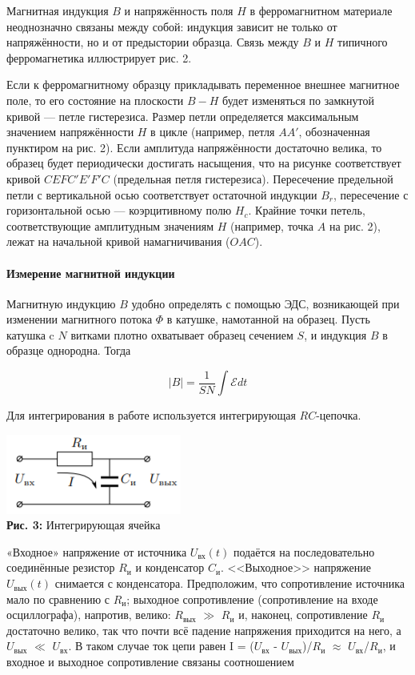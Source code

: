 \documentclass[12pt,a4paper]{scrartcl}
\begin{document}
	Магнитная индукция $ B $ и напряжённость поля $ H $ в ферромагнитном материале неоднозначно связаны между собой: индукция зависит
не только от напряжённости, но и от предыстории образца. Связь между $ B $ и $ H $ типичного ферромагнетика иллюстрирует рис. 2.

Если к ферромагнитному образцу прикладывать переменное внешнее
магнитное поле, то его состояние на плоскости $ B-H $ будет изменяться
по замкнутой кривой — петле гистерезиса. Размер петли определяется
максимальным значением напряжённости $ H $ в цикле (например, петля $ AA' $,
обозначенная пунктиром на рис. 2). Если амплитуда напряжённости достаточно велика, то образец будет периодически достигать насыщения,
что на рисунке соответствует кривой $ CEFC'E'F'C $ (предельная петля
гистерезиса). Пересечение предельной петли с вертикальной осью соответствует остаточной индукции $B_r$, пересечение с горизонтальной осью
— коэрцитивному полю $H_c$. Крайние точки петель, соответствующие амплитудным значениям $ H $ (например, точка $ A $ на рис. 2), лежат на начальной кривой намагничивания ($ OAC $).
	
	\paragraph{Измерение магнитной индукции} \hfill
	
	Магнитную индукцию $ B $ удобно
определять с помощью ЭДС, возникающей при изменении магнитного
потока $ \Phi $ в катушке, намотанной на образец. Пусть катушка c $ N $ витками плотно охватывает образец сечением $ S $, и индукция $ B $ в образце
однородна. Тогда	

	$$|B|=\frac{1}{SN}\int\mathcal{E} dt$$
	
Для интегрирования в работе используется интегрирующая $ RC $-цепочка.	

	\begin{center}
		\includegraphics[scale=0.8]{PIC_3.png}
		\\\textbf{Рис. 3: } Интегрирующая ячейка
	\end{center}
	
	«Входное» напряжение от источника $U_{\text{вх}}(t)$ подаётся на последовательно соединённые резистор $R_\text{и}$ и конденсатор $C_\text{и}$. <<Выходное>>
напряжение $U_{\text{вых}}(t)$ снимается с конденсатора. Предположим, что сопротивление источника мало по сравнению с $R_\text{и}$; выходное сопротивление (сопротивление на входе осциллографа), напротив, велико: $R_{\text{вых}}$ $ \gg $ $R_\text{и}$ и, наконец, сопротивление $R_\text{и}$ достаточно велико, так что почти всё падение напряжения приходится на него, а $U_{\text{вых}}$ $\ll$ $U_{\text{вх}}$. В таком случае ток цепи равен I = ($U_{\text{вх}}$ - $U_{\text{вых}}$)/$R_\text{и}$ $\approx$ $U_{\text{вх}}$/$R_\text{и}$, и входное и выходное сопротивление связаны соотношением
\end{document}
